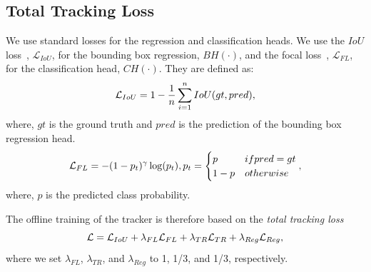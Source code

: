 \subsection{Total Tracking Loss} 
We use standard losses for the regression and classification heads. We use the $IoU$ loss~\cite{rezatofighi2019generalized}, $\mathcal{L}_{IoU}$, for the bounding box regression, $BH(\cdot)$, and the focal loss~\cite{lin2017focal}, $\mathcal{L}_{FL}$, for the classification head, $CH(\cdot)$.
They are defined as:
\begin{equation}
  \centering
  \label{eq:iou}
      \begin{aligned} 
          \mathcal{L}_{IoU} = 1 -  \frac{1}{n} \sum^{n}_{i=1} IoU(gt,pred),
      \end{aligned}
\end{equation}
where, $gt$ is the ground truth and $pred$ is the prediction of the bounding box regression head.
\begin{equation}
  \centering
  \label{eq:focal}
      \begin{aligned}
          \mathcal{L}_{FL} =  -(1-p_t)^\gamma \log(p_t),  p_t= \begin{cases} p & if \text{\break } pred=gt\\ 1-p & otherwise \end{cases}  ,
      \end{aligned}
\end{equation}
where, $p$ is the predicted class probability.

The offline training of the tracker is therefore based on the \emph{total tracking loss}
\begin{equation} \small
  \centering
  \label{eq:overall_loss}
          \mathcal{L} =  \mathcal{L}_{IoU} + \lambda_{FL} \mathcal{L}_{FL} + \lambda_{TR} \mathcal{L}_{TR} + \lambda_{Reg} \mathcal{L}_{Reg},
\end{equation}
where we set $\lambda_{FL}$, $\lambda_{TR}$, and $\lambda_{Reg}$ to 1, 1/3, and 1/3, respectively.

